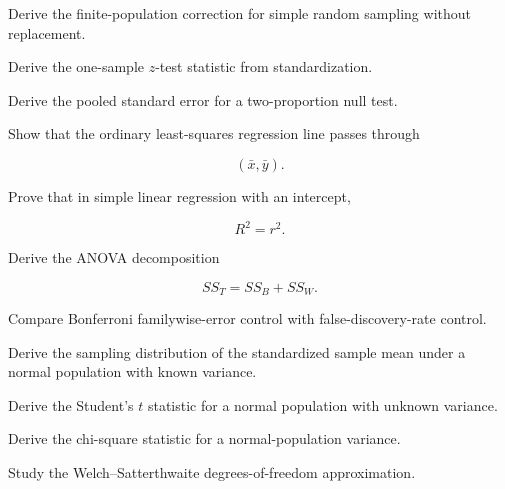 \begin{exercise}[3]
Derive the finite-population correction for simple random sampling without
replacement.
\end{exercise}

\begin{exercise}[3]
Derive the one-sample \(z\)-test statistic from standardization.
\end{exercise}

\begin{exercise}[3]
Derive the pooled standard error for a two-proportion null test.
\end{exercise}

\begin{exercise}[3]
Show that the ordinary least-squares regression line passes through

\[
(\bar{x},\bar{y}).
\]
\end{exercise}

\begin{exercise}[3]
Prove that in simple linear regression with an intercept,

\[
R^2=r^2.
\]
\end{exercise}

\begin{exercise}[3]
Derive the ANOVA decomposition

\[
SS_T=SS_B+SS_W.
\]
\end{exercise}

\begin{exercise}[3]
Compare Bonferroni familywise-error control with false-discovery-rate control.
\end{exercise}

\begin{exercise}[4]
Derive the sampling distribution of the standardized sample mean under a
normal population with known variance.
\end{exercise}

\begin{exercise}[4]
Derive the Student's \(t\) statistic for a normal population with unknown
variance.
\end{exercise}

\begin{exercise}[4]
Derive the chi-square statistic for a normal-population variance.
\end{exercise}

\begin{exercise}[4]
Study the Welch--Satterthwaite degrees-of-freedom approximation.
\end{exercise}

